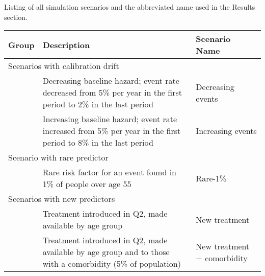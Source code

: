 
	\caption[Listing of all simulation scenarios]{\label{tab:scenRef}Listing of all simulation scenarios and the abbreviated name used in the Results section.}
	\centering
	\small
	\begin{tabular}{ p{.05\linewidth}p{.65\linewidth}p{.16\linewidth}}
		\toprule
		Group & Description & Scenario Name\\
		\midrule
		\multicolumn{3}{l}{Scenarios with calibration drift }  \\
		& Decreasing baseline hazard; event rate decreased from 5\% per year in the first period to 2\% in the last period  &  Decreasing events\\
		& Increasing baseline hazard; event rate increased from 5\% per year in the first period to 8\% in the last period  &  Increasing events\\
		\midrule 
		\multicolumn{3}{l}{Scenario with rare predictor} \\
		& Rare risk factor for an event found in 1\% of people over age 55 & Rare-1\%\\	
		\midrule
		\multicolumn{3}{l}{Scenarios with new predictors} \\
		& Treatment introduced in Q2, made available by age group & New treatment\\
		& Treatment introduced in Q2, made available by age group and to those with a comorbidity (5\% of population)  & {\raggedright New treatment + comorbidity} \\
		\bottomrule
		
	\end{tabular}
	
